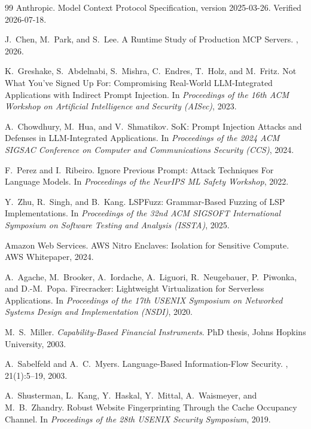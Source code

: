 \documentclass[sigconf, anonymous, natbib=false]{acmart}
\begin{document}
\begin{thebibliography}{99}
Anthropic.
\newblock Model Context Protocol Specification, version
  2025-03-26.
\newblock Verified 2026-07-18.

J.~Chen, M.~Park, and S.~Lee.
\newblock A Runtime Study of Production MCP Servers.
, 2026.

K.~Greshake, S.~Abdelnabi, S.~Mishra, C.~Endres, T.~Holz,
  and M.~Fritz.
\newblock Not What You've Signed Up For: Compromising
  Real-World LLM-Integrated Applications with Indirect
  Prompt Injection.
\newblock In {\em Proceedings of the 16th ACM Workshop on
  Artificial Intelligence and Security (AISec)}, 2023.

A.~Chowdhury, M.~Hua, and V.~Shmatikov.
\newblock SoK: Prompt Injection Attacks and Defenses in
  LLM-Integrated Applications.
\newblock In {\em Proceedings of the 2024 ACM SIGSAC
  Conference on Computer and Communications Security
  (CCS)}, 2024.

F.~Perez and I.~Ribeiro.
\newblock Ignore Previous Prompt: Attack Techniques For
  Language Models.
\newblock In {\em Proceedings of the NeurIPS ML Safety
  Workshop}, 2022.

Y.~Zhu, R.~Singh, and B.~Kang.
\newblock LSPFuzz: Grammar-Based Fuzzing of LSP
  Implementations.
\newblock In {\em Proceedings of the 32nd ACM SIGSOFT
  International Symposium on Software Testing and
  Analysis (ISSTA)}, 2025.

Amazon Web Services.
\newblock AWS Nitro Enclaves: Isolation for Sensitive
  Compute.
\newblock AWS Whitepaper, 2024.

A.~Agache, M.~Brooker, A.~Iordache, A.~Liguori, R.~Neugebauer,
  P.~Piwonka, and D.-M.~Popa.
\newblock Firecracker: Lightweight Virtualization for
  Serverless Applications.
\newblock In {\em Proceedings of the 17th USENIX Symposium
  on Networked Systems Design and Implementation
  (NSDI)}, 2020.

M.~S.~Miller.
\newblock \emph{Capability-Based Financial Instruments}.
\newblock PhD thesis, Johns Hopkins University, 2003.

A.~Sabelfeld and A.~C.~Myers.
\newblock Language-Based Information-Flow Security.
, 21(1):5--19, 2003.

A.~Shusterman, L.~Kang, Y.~Haskal, Y.~Mittal, A.~Waismeyer,
  and M.~B.~Zhandry.
\newblock Robust Website Fingerprinting Through the
  Cache Occupancy Channel.
\newblock In {\em Proceedings of the 28th USENIX Security
  Symposium}, 2019.

\end{thebibliography}
\end{document}
